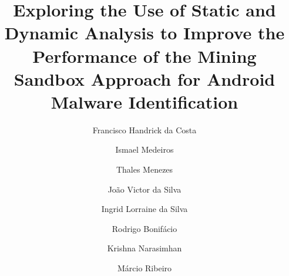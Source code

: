 \documentclass[review]{elsarticle}
\begin{document}
\begin{frontmatter}
\title{Exploring the Use of Static and Dynamic Analysis to Improve the Performance of the Mining Sandbox Approach for Android Malware Identification}


\author[1]{Francisco Handrick da Costa}
\author[1]{Ismael Medeiros}
\author[1]{Thales Menezes}
\author[1]{Jo\~{a}o Victor da Silva}
\author[1]{Ingrid Lorraine da Silva}
\author[1]{Rodrigo Bonif\'{a}cio}
\author[2]{Krishna Narasimhan}
\author[3]{M\'{a}rcio Ribeiro}

\address[1]{Computer Science Department, University of Bras\'{i}lia, Brazil}
\address[2]{Software Technology Group, TU Darmstadt, Germany}
\address[3]{Institute of Computing, Federal University of Alagoas, Brazil}




\end{frontmatter}












% 
\end{document}
